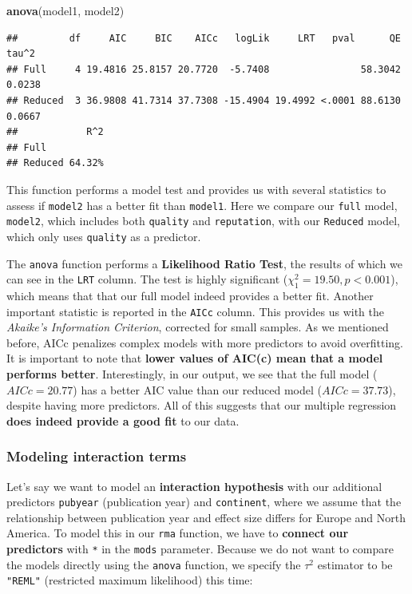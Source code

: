 \documentclass[]{book}
\newenvironment{Shaded}{\begin{snugshade}}{\end{snugshade}}
\newcommand{\KeywordTok}[1]{\textcolor[rgb]{0.13,0.29,0.53}{\textbf{#1}}}
\newcommand{\NormalTok}[1]{#1}
\begin{document}
\begin{Shaded}
\begin{Highlighting}[]
\KeywordTok{anova}\NormalTok{(model1, model2)}
\end{Highlighting}
\end{Shaded}

\begin{verbatim}
##         df     AIC     BIC    AICc   logLik     LRT   pval      QE  tau^2
## Full     4 19.4816 25.8157 20.7720  -5.7408                58.3042 0.0238
## Reduced  3 36.9808 41.7314 37.7308 -15.4904 19.4992 <.0001 88.6130 0.0667
##            R^2
## Full          
## Reduced 64.32%
\end{verbatim}

This function performs a model test and provides us with several statistics to assess if \texttt{model2} has a better fit than \texttt{model1}. Here we compare our \texttt{full} model, \texttt{model2}, which includes both \texttt{quality} and \texttt{reputation}, with our \texttt{Reduced} model, which only uses \texttt{quality} as a predictor.

The \texttt{anova} function performs a \textbf{Likelihood Ratio Test}, the results of which we can see in the \texttt{LRT} column. The test is highly significant (\(\chi^2_1=19.50, p<0.001\)), which means that that our full model indeed provides a better fit. Another important statistic is reported in the \texttt{AICc} column. This provides us with the \emph{Akaike's Information Criterion}, corrected for small samples. As we mentioned before, AICc penalizes complex models with more predictors to avoid overfitting. It is important to note that \textbf{lower values of AIC(c) mean that a model performs better}. Interestingly, in our output, we see that the full model (\(AICc=20.77\)) has a better AIC value than our reduced model (\(AICc=37.73\)), despite having more predictors. All of this suggests that our multiple regression \textbf{does indeed provide a good fit} to our data.

\hypertarget{modeling-interaction-terms}{%
\subsubsection{Modeling interaction terms}\label{modeling-interaction-terms}}

Let's say we want to model an \textbf{interaction hypothesis} with our additional predictors \texttt{pubyear} (publication year) and \texttt{continent}, where we assume that the relationship between publication year and effect size differs for Europe and North America. To model this in our \texttt{rma} function, we have to \textbf{connect our predictors} with \texttt{*} in the \texttt{mods} parameter. Because we do not want to compare the models directly using the \texttt{anova} function, we specify the \(\tau^2\) estimator to be \texttt{"REML"} (restricted maximum likelihood) this time:
\end{document}
